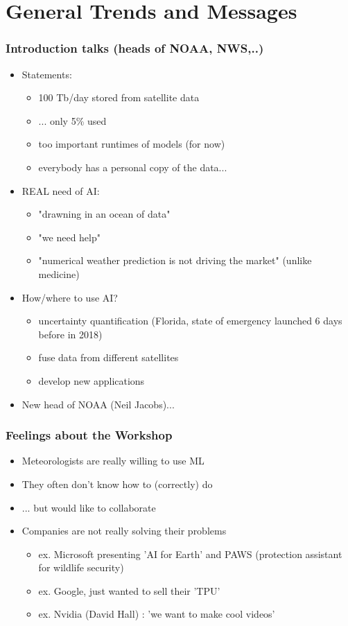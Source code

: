 \documentclass{beamer}
\begin{document}
\section{General Trends and Messages}
\begin{frame}
\frametitle{Introduction talks (heads of NOAA, NWS,..)}

\begin{itemize}

\item Statements: 
	\begin{itemize}
		\item 100 Tb/day stored from satellite data
		\item ... only 5\% used
		\item too important runtimes of models (for now)
		\item everybody has a personal copy of the data...
	\end{itemize}
\item REAL need of AI:
	\begin{itemize}
		\item "drawning in an ocean of data"
		\item "we need help"
		\item "numerical weather prediction is not driving the market" (unlike medicine)
	\end{itemize}
\item How/where to use AI?
	\begin{itemize}
		\item uncertainty quantification (Florida, state of emergency launched 6 days before in 2018)
		\item fuse data from different satellites
		\item develop new applications
	\end{itemize}
\item New head of NOAA (Neil Jacobs)...
\end{itemize}
\end{frame}


\begin{frame}
\frametitle{Feelings about the Workshop}

\begin{itemize}
	\item Meteorologists are really willing to use ML
	\item They often don't know how to (correctly) do
	\item ... but would like to collaborate
	\item Companies are not really solving their problems
		\begin{itemize}
			\item ex. Microsoft presenting 'AI for Earth' and PAWS (protection assistant for wildlife security)
			\item ex. Google, just wanted to sell their 'TPU'
			\item ex. Nvidia (David Hall) : 'we want to make cool videos' 
		\end{itemize}
\end{itemize}
\end{frame}
\end{document}
